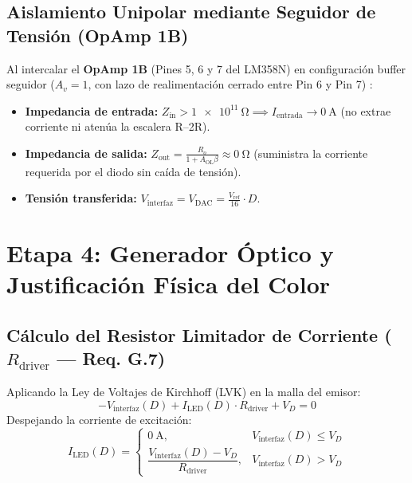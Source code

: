 \documentclass[11pt,letterpaper]{article}
\begin{document}
\subsection{Aislamiento Unipolar mediante Seguidor de Tensión (OpAmp 1B)}
Al intercalar el \textbf{OpAmp 1B} (Pines 5, 6 y 7 del LM358N) en configuración buffer seguidor ($A_v = 1$, con lazo de realimentación cerrado entre Pin 6 y Pin 7) \cite{franco2015}:
\begin{itemize}
    \item \textbf{Impedancia de entrada:} $Z_{\text{in}} > \SI{1e11}{\ohm} \implies I_{\text{entrada}} \to \SI{0}{\ampere}$ (no extrae corriente ni atenúa la escalera R--2R).
    \item \textbf{Impedancia de salida:} $Z_{\text{out}} = \frac{R_o}{1 + A_{\text{OL}}\beta} \approx \SI{0}{\ohm}$ (suministra la corriente requerida por el diodo sin caída de tensión).
    \item \textbf{Tensión transferida:} $V_{\text{interfaz}} = V_{\text{DAC}} = \frac{V_{\text{ref}}}{16} \cdot D$.
\end{itemize}

\section{Etapa 4: Generador Óptico y Justificación Física del Color}

\subsection{Cálculo del Resistor Limitador de Corriente ($R_{\text{driver}}$ — Req. G.7)}
Aplicando la Ley de Voltajes de Kirchhoff (LVK) en la malla del emisor:
\begin{equation}
-V_{\text{interfaz}}(D) + I_{\text{LED}}(D) \cdot R_{\text{driver}} + V_D = 0
\end{equation}
Despejando la corriente de excitación:
\begin{equation}
I_{\text{LED}}(D) = \begin{cases} 
\SI{0}{\ampere}, & V_{\text{interfaz}}(D) \le V_D \\ 
\dfrac{V_{\text{interfaz}}(D) - V_D}{R_{\text{driver}}}, & V_{\text{interfaz}}(D) > V_D 
\end{cases}
\label{eq:lvk_corriente_led}
\end{equation}
\end{document}
